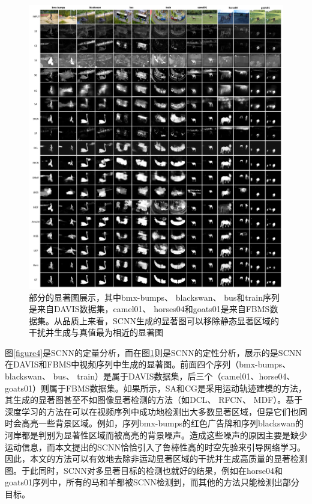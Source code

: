 \begin{figure}[tbp]
\includegraphics[width=15cm]{figures/show_new}
\caption{部分的显著图展示，其中bmx-bumps、 blackswan、 bus和train序列是来自DAVIS数据集，camel01、 horses04和goats01是来自FBMS数据集。从品质上来看，SCNN生成的显著图可以移除静态显著区域的干扰并生成与真值最为相近的显著图}
\label{figure5}
\end{figure}

图\ref{figure4}是SCNN的定量分析，而在图\ref{figure5}则是SCNN的定性分析，展示的是SCNN在DAVIS和FBMS中视频序列中生成的显著图。前面四个序列（bmx-bumps、 blackswan、 bus、 train）是属于DAVIS数据集，后三个（camel01、horse04、goats01）则属于FBMS数据集。如果所示，SA和CG是采用运动轨迹建模的方法，其生成的显著图甚至不如图像显著检测的方法（如DCL、 RFCN、 MDF）。基于深度学习的方法在可以在视频序列中成功地检测出大多数显著区域，但是它们也同时会高亮一些背景区域。例如，序列bmx-bumps的红色广告牌和序列blackswan的河岸都是判别为显著性区域而被高亮的背景噪声。造成这些噪声的原因主要是缺少运动信息，而本文提出的SCNN恰恰引入了鲁棒性高的时空先验来引导网络学习。因此，本文的方法可以有效地去除非运动显著区域的干扰并生成高质量的显著检测图。于此同时，SCNN对多显著目标的检测也就好的结果，例如在horse04和goats01序列中，所有的马和羊都被SCNN检测到，而其他的方法只能检测出部分目标。

